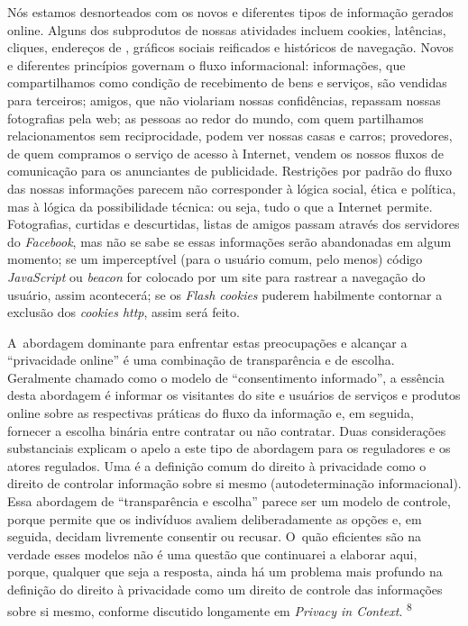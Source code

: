 Nós estamos desnorteados com os novos e diferentes tipos de informação
gerados online. Alguns dos subprodutos de nossas atividades incluem
cookies, latências, cliques, endereços de , gráficos sociais
reificados e históricos de navegação. Novos e diferentes princípios
governam o fluxo informacional: informações, que compartilhamos como
condição de recebimento de bens e serviços, são vendidas para terceiros;
amigos, que não violariam nossas confidências, repassam nossas
fotografias pela web; as pessoas ao redor do mundo, com quem partilhamos
relacionamentos sem reciprocidade, podem ver nossas casas e carros;
provedores, de quem compramos o serviço de acesso à Internet, vendem os
nossos fluxos de comunicação para os anunciantes de publicidade.
Restrições por padrão do fluxo das nossas informações parecem não
corresponder à lógica social, ética e política, mas à lógica da
possibilidade técnica: ou seja, tudo o que a Internet permite.
Fotografias, curtidas e descurtidas, listas de amigos passam através dos
servidores do \emph{Facebook}, mas não se sabe se essas informações
serão abandonadas em algum momento; se um imperceptível (para o usuário
comum, pelo menos) código \emph{JavaScript} ou \emph{beacon} for
colocado por um site para rastrear a navegação do usuário, assim
acontecerá; se os \emph{Flash cookies} puderem habilmente contornar a
exclusão dos \emph{cookies http}, assim será feito.

A~abordagem dominante para enfrentar estas preocupações e alcançar a
``privacidade online'' é uma combinação de transparência e de escolha.
Geralmente chamado como o modelo de ``consentimento informado'', a
essência desta abordagem é informar os visitantes do site e usuários de
serviços e produtos online sobre as respectivas práticas do fluxo da
informação e, em seguida, fornecer a escolha binária entre contratar ou
não contratar. Duas considerações substanciais explicam o apelo a este
tipo de abordagem para os reguladores e os atores regulados. Uma é a
definição comum do direito à privacidade como o direito de controlar
informação sobre si mesmo (autodeterminação informacional). Essa
abordagem de ``transparência e escolha'' parece ser um modelo de
controle, porque permite que os indivíduos avaliem deliberadamente as
opções e, em seguida, decidam livremente consentir ou recusar. O~quão
eficientes são na verdade esses modelos não é uma questão que
continuarei a elaborar aqui, porque, qualquer que seja a resposta, ainda
há um problema mais profundo na definição do direito à privacidade como
um direito de controle das informações sobre si mesmo, conforme
discutido longamente em \emph{Privacy in Context}. \textsuperscript{{8}}

